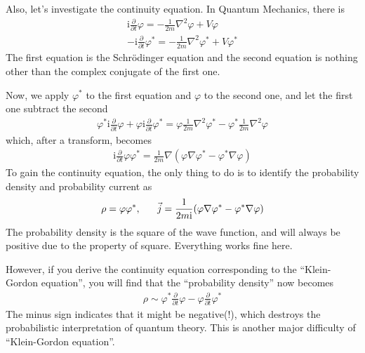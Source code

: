 \documentclass[letterpaper,10pt,english]{sphinxmanual}
\begin{document}
Also, let’s investigate the continuity equation. In Quantum Mechanics, there is
\begin{equation*}
\begin{split}\mathrm{i}\frac{\partial}{\partial t}\varphi = -\frac{1}{2m}\nabla^2\varphi + V\varphi\\
-\mathrm{i}\frac{\partial}{\partial t}\varphi^* = -\frac{1}{2m}\nabla^2\varphi^* + V\varphi^*\end{split}
\end{equation*}
The first equation is the Schrödinger equation and the second equation is nothing other than the complex conjugate of the first one.

Now, we apply \(\varphi^*\) to the first equation and \(\varphi\) to the second one, and let the first one subtract the second
\begin{equation*}
\begin{split}\varphi^*\mathrm{i}\frac{\partial}{\partial t}\varphi + \varphi\mathrm{i}\frac{\partial}{\partial t}\varphi^* = \varphi\frac{1}{2m}\nabla^2\varphi^* - \varphi^*\frac{1}{2m}\nabla^2\varphi\end{split}
\end{equation*}
which, after a transform, becomes
\begin{equation*}
\begin{split}\mathrm{i}\frac{\partial}{\partial t}\varphi\varphi^* = \frac{1}{2m}\nabla(\varphi\nabla\varphi^* - \varphi^*\nabla\varphi)\end{split}
\end{equation*}
To gain the continuity equation, the only thing to do is to identify the probability density and probability current as
\begin{equation*}
\begin{split}\rho = \varphi\varphi^*,\ \ \ \ \ \vec{j} = {1\over2m\mathrm i}(\varphi\nabla\varphi^* - \varphi^*\nabla\varphi)\end{split}
\end{equation*}
The probability density is the square of the wave function, and will always be positive due to the property of square. Everything works fine here.

However, if you derive the continuity equation corresponding to the “Klein-Gordon equation”, you will find that the “probability density” now becomes
\begin{equation*}
\begin{split}\rho \sim \varphi^*\frac{\partial}{\partial t}\varphi - \varphi\frac{\partial}{\partial t}\varphi^*\end{split}
\end{equation*}
The minus sign indicates that it might be negative(!), which destroys the probabilistic interpretation of quantum theory. This is another major difficulty of “Klein-Gordon equation”.
\end{document}
